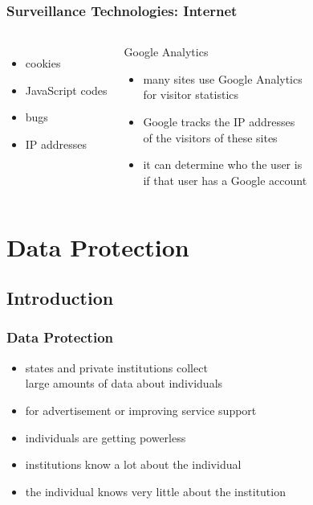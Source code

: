 \documentclass[dvipsnames]{beamer}
\theoremstyle{plain}
\begin{document}
\begin{frame}
  \frametitle{Surveillance Technologies: Internet}

  \begin{columns}[t]
    \begin{itemize}
      \item cookies
      \item JavaScript codes
      \item bugs
      \item IP addresses
    \end{itemize}

    \pause
    \begin{exampleblock}{Google Analytics}
      \begin{itemize}
        \item many sites use Google Analytics\\
          for visitor statistics
        \item Google tracks the IP addresses\\
          of the visitors of these sites
        \item it can determine who the user is\\
          if that user has a Google account
      \end{itemize}
    \end{exampleblock}
  \end{columns}
\end{frame}

\section{Data Protection}

\subsection{Introduction}

\begin{frame}
  \frametitle{Data Protection}

  \begin{itemize}
    \item states and private institutions collect\\
      large amounts of data about individuals
    \item for advertisement or improving service support

    \bigskip
    \item individuals are getting powerless
    \item institutions know a lot about the individual
    \item the individual knows very little about the institution
  \end{itemize}
\end{frame}
\end{document}
